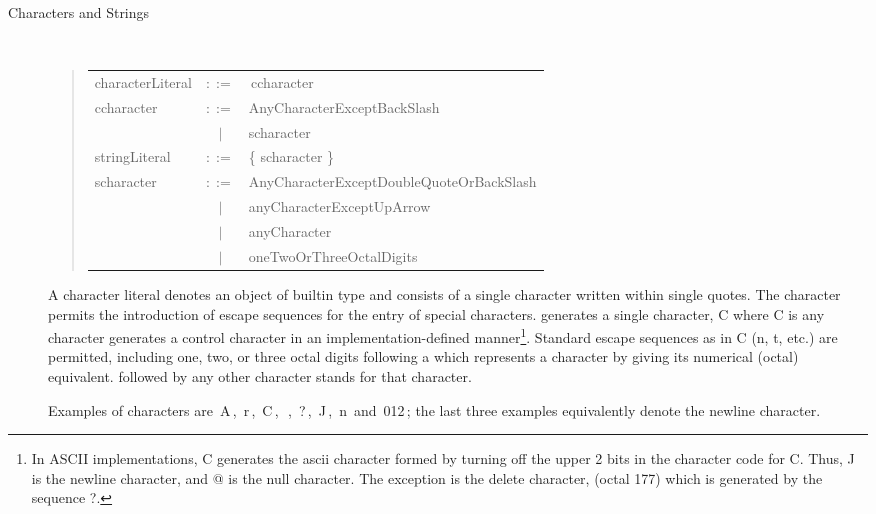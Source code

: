\begin{description}
\item[Characters and Strings]~\\
\label{character literals}
\newcommand{\charlit}[1]{\terminal{'}\,#1\,\terminal{'}}

\begin{quote}\it\begin{tabular}{lcl}
characterLiteral &$::=$& \charlit{ccharacter} \\[1ex]
ccharacter & $::=$&	AnyCharacterExceptBackSlash  \\
& $|$ & scharacter\\[1ex]
stringLiteral &$::=$& \terminal{"} \{ scharacter \} \terminal{"}\\[1ex]
scharacter & $::=$&	AnyCharacterExceptDoubleQuoteOrBackSlash  \\
& $|$ & \terminal{\mybackslash} anyCharacterExceptUpArrow   \\
& $|$ & \terminal{\mybackslash}\terminal{\myuparrow}anyCharacter \\
& $|$ & \terminal{\mybackslash}oneTwoOrThreeOctalDigits
\end{tabular}\end{quote}
A character literal denotes an object of builtin type  and
consists of a single character written within single quotes.
The character \mybackslash{} permits the introduction of
escape sequences for the entry of special characters.
\mybackslash\mybackslash{} generates a single \mybackslash{} character,
\mybackslash\myuparrow{}C where C is any character
generates a control character in an implementation-defined
manner\footnote{
In ASCII implementations, \mybackslash\myuparrow{}C
generates the ascii character formed by turning off the upper 2 bits
in the character code for C.  Thus, \mybackslash\myuparrow{}J
is the newline character, and \mybackslash\myuparrow{}@ is the
null character.  The exception is the delete character, (octal 177) which is
generated by the sequence \mybackslash\myuparrow{}?.}.  Standard escape
sequences as in C (\mybackslash{}n, \mybackslash{}t,
etc.) are permitted, including one, two, or three octal digits
following a \mybackslash{} which represents a character by giving
its numerical (octal) equivalent.
\terminal{\mybackslash} followed by any other character stands for that
character.

Examples of characters are \charlit{A}, \charlit{r},
\charlit{\mybackslash\myuparrow{}C},
\charlit{\mybackslash\mybackslash},
\charlit{\mybackslash\myuparrow{}?},
\charlit{\mybackslash\myuparrow{}J}, \charlit{\mybackslash{}n} and
\charlit{\mybackslash{}012};
the last three examples equivalently denote the newline character.


\end{description}
